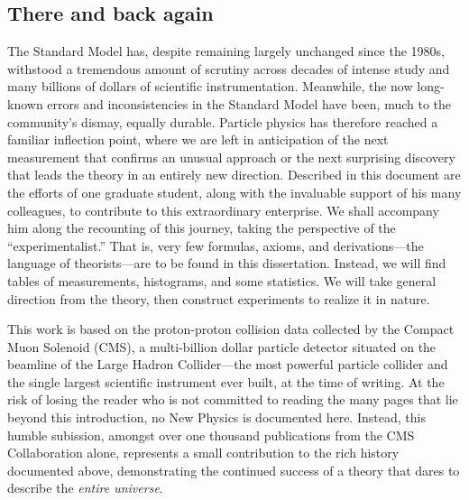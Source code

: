 \begin{dissertationintroduction}
\section*{There and back again}
The Standard Model has, despite remaining largely unchanged since the 1980s, withstood a tremendous amount of scrutiny across decades of intense study and many billions of dollars of scientific instrumentation. %
Meanwhile, the now long-known errors and inconsistencies in the Standard Model have been, much to the community's dismay, equally durable. %
Particle physics has therefore reached a familiar inflection point, where we are left in anticipation of the next measurement that confirms an unusual approach or the next surprising discovery that leads the theory in an entirely new direction. 
Described in this document are the efforts of one graduate student, along with the invaluable support of his many colleagues, to contribute to this extraordinary enterprise. 
We shall accompany him along the recounting of this journey, taking the perspective of the ``experimentalist.'' 
That is, very few formulas, axioms, and derivations---the language of theorists---are to be found in this dissertation. 
Instead, we will find tables of measurements, histograms, and some statistics. 
We will take general direction from the theory, then construct experiments to realize it in nature. 

This work is based on the proton-proton collision data collected by the Compact Muon Solenoid (CMS), a multi-billion dollar particle detector situated on the beamline of the Large Hadron Collider---the most powerful particle collider and the single largest scientific instrument ever built, at the time of writing. 
At the risk of losing the reader who is not committed to reading the many pages that lie beyond this introduction, no New Physics is documented here.
Instead, this humble subission, amongst over one thousand publications from the CMS Collaboration alone, represents a small contribution to the rich history documented above, demonstrating the continued success of a theory that dares to describe the \textit{entire universe}.
\end{dissertationintroduction}
